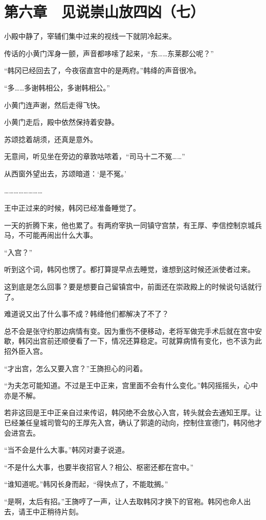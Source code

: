 \section{第六章　见说崇山放四凶（七）}

小殿中静了，宰辅们集中过来的视线一下就阴冷起来。

传话的小黄门浑身一颤，声音都哆嗦了起来，“东……东莱郡公呢？”

“韩冈已经回去了，今夜宿直宫中的是两府。”韩绛的声音很冷。

“多……多谢韩相公，多谢韩相公。”

小黄门连声谢，然后走得飞快。

小黄门走后，殿中依然保持着安静。

苏颂捻着胡须，还真是意外。

无意间，听见坐在旁边的章敦咕哝着，“司马十二不冤……”

从西窗外望出去，苏颂暗道：‘是不冤。’

……………………

王中正过来的时候，韩冈已经准备睡觉了。

一天的折腾下来，他也累了。有两府宰执一同镇守宫禁，有王厚、李信控制京城兵马，不可能再闹出什么大事。

“入宫？”

听到这个词，韩冈也愣了。都打算提早点去睡觉，谁想到这时候还派使者过来。

这到底是怎么回事？要是想要自己留镇宫中，前面还在崇政殿上的时候说句话就行了。

难道说又出了什么事不成？韩绛他们都解决了不了？

总不会是张守约那边病情有变。因为重伤不便移动，老将军做完手术后就在宫中安歇，韩冈出宫前还顺便看了一下，情况还算稳定。可就算病情有变化，也不该为此招外臣入宫。

“才出宫，怎么又要入宫？”王旖担心的问着。

“为夫怎可能知道。不过是王中正来，宫里面不会有什么变化。”韩冈摇摇头，心中亦是不解。

若非这回是王中正亲自过来传诏，韩冈绝不会放心入宫，转头就会去通知王厚。让已经兼任皇城司管勾的王厚先入宫，确认了郭逵的动向，控制住宣德门，韩冈他才会进宫去。

“当不会是什么大事。”韩冈对妻子说道。

“不是什么大事，也要半夜招官人？相公、枢密还都在宫中。”

“谁知道呢。”韩冈长身而起，“得快点了，不能耽搁。”

“是啊，太后有招。”王旖哼了一声，让人去取韩冈才换下的官袍。韩冈也命人出去，请王中正稍待片刻。

